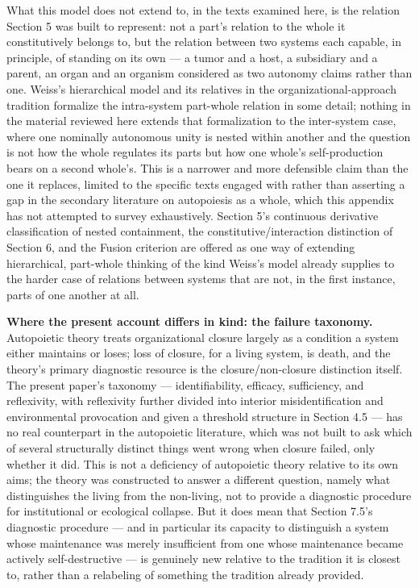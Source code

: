 \documentclass[11pt]{article}
\theoremstyle{plain}
\begin{document}
What this model does not extend to, in the texts examined here, is the relation Section 5 was built to represent: not a part's relation to the whole it constitutively belongs to, but the relation between two systems each capable, in principle, of standing on its own --- a tumor and a host, a subsidiary and a parent, an organ and an organism considered as two autonomy claims rather than one. Weiss's hierarchical model and its relatives in the organizational-approach tradition formalize the intra-system part-whole relation in some detail; nothing in the material reviewed here extends that formalization to the inter-system case, where one nominally autonomous unity is nested within another and the question is not how the whole regulates its parts but how one whole's self-production bears on a second whole's. This is a narrower and more defensible claim than the one it replaces, limited to the specific texts engaged with rather than asserting a gap in the secondary literature on autopoiesis as a whole, which this appendix has not attempted to survey exhaustively. Section 5's continuous derivative classification of nested containment, the constitutive/interaction distinction of Section 6, and the Fusion criterion are offered as one way of extending hierarchical, part-whole thinking of the kind Weiss's model already supplies to the harder case of relations between systems that are not, in the first instance, parts of one another at all.

\textbf{Where the present account differs in kind: the failure taxonomy.} Autopoietic theory treats organizational closure largely as a condition a system either maintains or loses; loss of closure, for a living system, is death, and the theory's primary diagnostic resource is the closure/non-closure distinction itself. The present paper's taxonomy --- identifiability, efficacy, sufficiency, and reflexivity, with reflexivity further divided into interior misidentification and environmental provocation and given a threshold structure in Section 4.5 --- has no real counterpart in the autopoietic literature, which was not built to ask which of several structurally distinct things went wrong when closure failed, only whether it did. This is not a deficiency of autopoietic theory relative to its own aims; the theory was constructed to answer a different question, namely what distinguishes the living from the non-living, not to provide a diagnostic procedure for institutional or ecological collapse. But it does mean that Section 7.5's diagnostic procedure --- and in particular its capacity to distinguish a system whose maintenance was merely insufficient from one whose maintenance became actively self-destructive --- is genuinely new relative to the tradition it is closest to, rather than a relabeling of something the tradition already provided.
\end{document}

